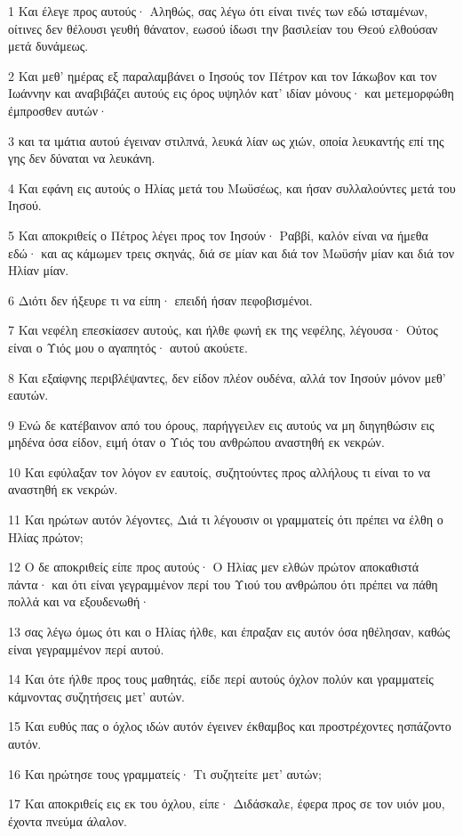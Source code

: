 \par 1 Και έλεγε προς αυτούς· Αληθώς, σας λέγω ότι είναι τινές των εδώ ισταμένων, οίτινες δεν θέλουσι γευθή θάνατον, εωσού ίδωσι την βασιλείαν του Θεού ελθούσαν μετά δυνάμεως.
\par 2 Και μεθ' ημέρας εξ παραλαμβάνει ο Ιησούς τον Πέτρον και τον Ιάκωβον και τον Ιωάννην και αναβιβάζει αυτούς εις όρος υψηλόν κατ' ιδίαν μόνους· και μετεμορφώθη έμπροσθεν αυτών·
\par 3 και τα ιμάτια αυτού έγειναν στιλπνά, λευκά λίαν ως χιών, οποία λευκαντής επί της γης δεν δύναται να λευκάνη.
\par 4 Και εφάνη εις αυτούς ο Ηλίας μετά του Μωϋσέως, και ήσαν συλλαλούντες μετά του Ιησού.
\par 5 Και αποκριθείς ο Πέτρος λέγει προς τον Ιησούν· Ραββί, καλόν είναι να ήμεθα εδώ· και ας κάμωμεν τρεις σκηνάς, διά σε μίαν και διά τον Μωϋσήν μίαν και διά τον Ηλίαν μίαν.
\par 6 Διότι δεν ήξευρε τι να είπη· επειδή ήσαν πεφοβισμένοι.
\par 7 Και νεφέλη επεσκίασεν αυτούς, και ήλθε φωνή εκ της νεφέλης, λέγουσα· Ούτος είναι ο Υιός μου ο αγαπητός· αυτού ακούετε.
\par 8 Και εξαίφνης περιβλέψαντες, δεν είδον πλέον ουδένα, αλλά τον Ιησούν μόνον μεθ' εαυτών.
\par 9 Ενώ δε κατέβαινον από του όρους, παρήγγειλεν εις αυτούς να μη διηγηθώσιν εις μηδένα όσα είδον, ειμή όταν ο Υιός του ανθρώπου αναστηθή εκ νεκρών.
\par 10 Και εφύλαξαν τον λόγον εν εαυτοίς, συζητούντες προς αλλήλους τι είναι το να αναστηθή εκ νεκρών.
\par 11 Και ηρώτων αυτόν λέγοντες, Διά τι λέγουσιν οι γραμματείς ότι πρέπει να έλθη ο Ηλίας πρώτον;
\par 12 Ο δε αποκριθείς είπε προς αυτούς· Ο Ηλίας μεν ελθών πρώτον αποκαθιστά πάντα· και ότι είναι γεγραμμένον περί του Υιού του ανθρώπου ότι πρέπει να πάθη πολλά και να εξουδενωθή·
\par 13 σας λέγω όμως ότι και ο Ηλίας ήλθε, και έπραξαν εις αυτόν όσα ηθέλησαν, καθώς είναι γεγραμμένον περί αυτού.
\par 14 Και ότε ήλθε προς τους μαθητάς, είδε περί αυτούς όχλον πολύν και γραμματείς κάμνοντας συζητήσεις μετ' αυτών.
\par 15 Και ευθύς πας ο όχλος ιδών αυτόν έγεινεν έκθαμβος και προστρέχοντες ησπάζοντο αυτόν.
\par 16 Και ηρώτησε τους γραμματείς· Τι συζητείτε μετ' αυτών;
\par 17 Και αποκριθείς εις εκ του όχλου, είπε· Διδάσκαλε, έφερα προς σε τον υιόν μου, έχοντα πνεύμα άλαλον.
